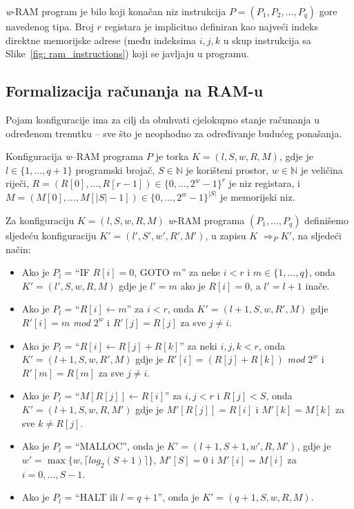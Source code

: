 \begin{definition}
   \emph{w}-RAM program je bilo koji konačan niz instrukcija $P = (P_1, P_2,\ldots, P_q)$ gore navedenog tipa. Broj $r$ registara je implicitno definiran kao  najveći indeks direktne memorijske adrese (među indeksima $i, j, k$ u skup instrukcija sa Slike~\ref{fig: ram_instructions}) koji se javljaju u programu.
\end{definition}

\subsection{Formalizacija računanja na RAM-u}

Pojam konfiguracije ima za cilj da obuhvati cjelokupno stanje računanja u određenom trenutku --  sve što je neophodno za određivanje budućeg ponašanja.
\begin{definition}
Konfiguracija  \emph{w}--RAM programa $P$ je torka $K = (l, S, w, R, M)$, gdje je $l \in  \{1, \ldots, q + 1\}$ 
programski brojač, $S \in  \mathbb{N}$ je korišteni prostor, $w \in  \mathbb{N}$ je veličina riječi, $R = (R[0], \ldots , R[r - 1]) \in  \{0, \ldots , 2^w - 1\}^r$ je
niz registara, i $M = (M[0], \ldots, M[|S| - 1]) \in  \{0, \ldots, 2^w - 1\}^{|S|}$ je memorijski niz.
\end{definition}
\begin{definition}
 Za konfiguraciju $K = (l, S, w, R, M)$ \textit{w}-RAM programa $(P_1, \ldots, P_q)$ definišemo sljedeću konfiguraciju $K' = (l', S', w', R', M')$, u zapisu $K$ $\Rightarrow_P K'$, na sljedeći način:
 
 \begin{itemize}
 	\item Ako je $P_l$ = ``IF $R[i] = 0$, GOTO $m$'' za neke $i < r$ i $m \in  \{1, \ldots , q\}$, onda  $K' = (l', S, w, R, M)$ gdje je  $l'= m$ ako je $R[i] = 0$, a $l' = l + 1$ inače. 
 	\item Ako je $P_l$ = ``$R[i] \leftarrow  m$'' za $i < r$, onda $K' = (l  + 1, S, w, R', M)$ gdje  $R'[i] = m$ \emph{mod} $2^w$ i $R'[ j] = R[ j]$ za sve $j \neq i$. 
 	\item Ako je $P_l$ = ``$R[i] \leftarrow R[ j] + R[k]$'' za neki $i, j, k < r$, onda  $K' = (l+1, S, w, R′, M)$   gdje je $R'[i] = (R[ j]+R[k])$ \textit{mod} $2^w$
 	i $R'[m] = R[m]$ za sve $j \neq i$.
 	\item Ako je $P_l$ = ``$M[R[ j]] \leftarrow R[i]$'' za $i, j < r$ i $R[ j] < S$, onda $K' = (l+ 1, S, w, R, M')$ gdje je $M'[R[ j]] = R[i]$ i
 	$M'[k] = M[k]$ za sve  $k \neq  R[ j]$.
 	\item Ako je $P_l$ = ``MALLOC'', onda je $K' = (l+ 1, S + 1, w', R, M')$, gdje je $w' = \max\{w, \lceil log_2(S + 1) \rceil \}$, $M'[S] = 0$ i
 	$M'[i] = M[i]$ za $i = 0, \ldots , S-1$.
 	\item Ako je $P_l$ = ``HALT ili  $l = q + 1$'', onda je $K' = (q + 1, S, w, R, M)$.
 \end{itemize}
 
 
\end{definition}

